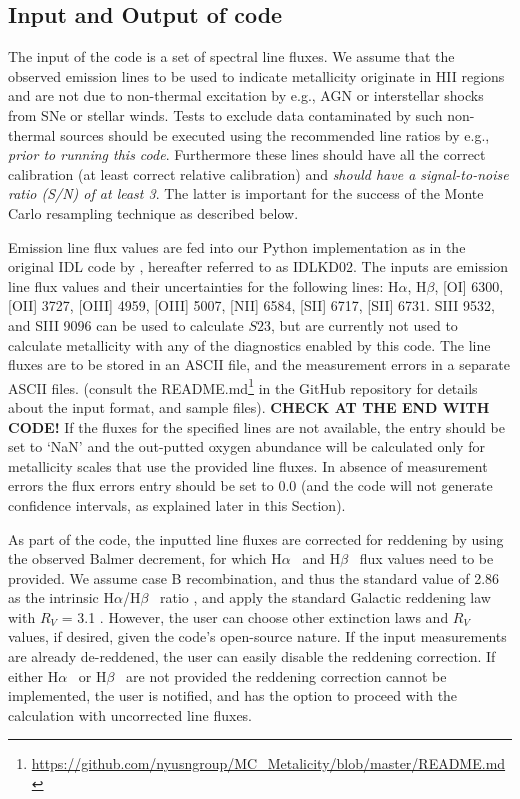 \documentclass{emulateapj}
\newcommand{\ha}{H$\alpha$}
\newcommand{\hb}{H$\beta$}
\begin{document}
\subsection{Input and Output of code}

The input of the code is a set of spectral line fluxes. We assume that the observed emission lines to be used to indicate metallicity originate in HII regions and are not due to non-thermal excitation by e.g., AGN or interstellar shocks from SNe or stellar winds.  Tests to exclude data contaminated by such non-thermal sources should be executed using the recommended line ratios by e.g., \citealt{baldwin81,kauffmann03,kewley06_sdss} \emph{prior to running this code}. Furthermore these lines should have all the correct calibration (at least correct relative calibration) and \emph{should have a signal-to-noise ratio (S/N) of at least 3}. The latter is important for the success of the Monte Carlo resampling technique as described below.

Emission line flux values are fed into our Python implementation as in the original IDL code by \citet{kewley02}, hereafter referred to as IDLKD02. The inputs are emission line flux values and their uncertainties for the following lines: \ha, \hb, [OI] 6300, [OII] 3727, [OIII] 4959, [OIII] 5007, [NII] 6584, [SII] 6717, [SII] 6731.  SIII 9532, and SIII 9096 can be used to calculate $S23$, but are currently not used to calculate metallicity with any of the diagnostics enabled by this code. The line fluxes are to be stored in an ASCII file, and the measurement errors in a separate ASCII files.
(consult the README.md\footnote{\url{https://github.com/nyusngroup/MC_Metalicity/blob/master/README.md}} in the GitHub repository for details about the input format, and sample files). \textbf{CHECK AT THE END WITH CODE!} 
 If the fluxes for the specified lines are not available, the entry should be set to `NaN' and the out-putted oxygen abundance will be calculated only for metallicity scales that use the provided line fluxes. In absence of measurement errors the flux errors entry should be set to 0.0 (and the code will not generate confidence intervals, as explained later in this Section).

As part of the code, the inputted line fluxes are corrected for reddening by using the observed Balmer decrement, for which \ha~ and  \hb~ flux values need to be provided. We assume case B recombination, and thus the standard value of 2.86 as the
intrinsic \ha/\hb~ ratio \citep{osterbrock89}, and apply the standard Galactic reddening law with $R_V$ = 3.1 \citep{cardelli89}. However, the user can choose other extinction laws and $R_V$ values, if desired, given the code's open-source nature. If the input measurements are already de-reddened, the user can easily disable the reddening correction. If either \ha~ or \hb~ are not provided the reddening correction cannot be implemented, the user is notified, and has the option to proceed with the calculation with uncorrected line fluxes.
\end{document}
